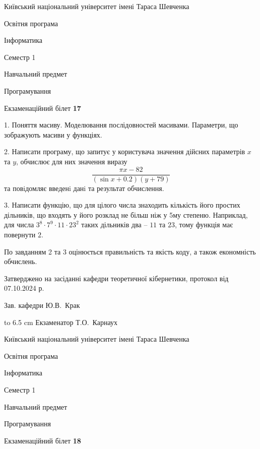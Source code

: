 \documentclass[12pt, ukrainian]{article}
\begin{document}
{{\begin {scriptsize}\par
{ \center  Київський національний університет імені Тараса Шевченка \par}
{\parbox {5 cm}{Освітня програма \hfill}{\parbox {7 cm}{Інформатика\hfill}}\parbox {6 cm}{\hfill Семестр 1}}\par
{\parbox {5 cm} {Навчальний предмет \hfill}\parbox {7 cm}{Програмування \hfill}\parbox {6cm}{\hfill}\par}\vspace{-15pt} \end{scriptsize}}{\center Екзаменаційний білет \No \textbf { 17 }\par}}
{%
1. Поняття масиву. Моделювання послідовностей масивами. Параметри, що зображують масиви у функціях.%
\par
2. Написати програму, що запитує у користувача значення дійсних параметрів $x$ та $y$, обчислює для них значення виразу 
$$\frac{\pi x - 82}{(\sin x + 0.2) (y + 79)}$$ 
та повiдомляє введенi данi та результат обчислення.

\par
3. Написати функцію, що для цілого числа знаходить кількість його простих дільників, що входять у його розклад не більш ніж у 5му степеню. Наприклад, для числа $3^8{\cdot}7^9{\cdot}11{\cdot}23^{2}$ таких дільників два – $11$ та $23$, тому функція має повернути $2$.

По завданням 2 та 3 оцінюється правильність та якість коду, а також економність обчислень.

}
{\smallskip\smallskip \begin {scriptsize} Затверджено на засіданні кафедри теоретичної кібернетики, протокол   від   07.10.2024 р.\par\smallskip\smallskip\smallskip\smallskip
{\parbox {6.5 cm} {Зав. кафедри \dotfill Ю.В.~Крак}}\hspace {0.7cm} {\hbox to 6.5 cm { Екзаменатор \dotfill Т.О.~Карнаух}} \end{scriptsize}}
\vspace{0.9cm}
{{\begin {scriptsize}\par
{ \center  Київський національний університет імені Тараса Шевченка \par}
{\parbox {5 cm}{Освітня програма \hfill}{\parbox {7 cm}{Інформатика\hfill}}\parbox {6 cm}{\hfill Семестр 1}}\par
{\parbox {5 cm} {Навчальний предмет \hfill}\parbox {7 cm}{Програмування \hfill}\parbox {6cm}{\hfill}\par}\vspace{-15pt} \end{scriptsize}}{\center Екзаменаційний білет \No \textbf { 18 }\par}}
\end{document}
